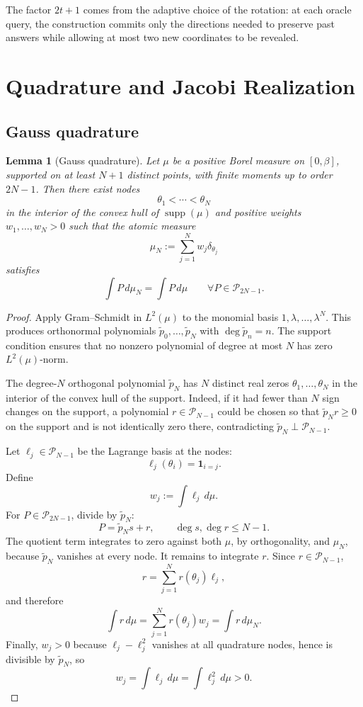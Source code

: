 \documentclass[11pt]{article}
\newtheorem{lemma}[theorem]{Lemma}
\theoremstyle{definition}
\newcommand{\Pcal}{\mathcal{P}}
\begin{document}
The factor \(2t+1\) comes from the adaptive choice of the rotation: at each
oracle query, the construction commits only the directions needed to preserve
past answers while allowing at most two new coordinates to be revealed.

\section{Quadrature and Jacobi Realization}

\subsection{Gauss quadrature}

\begin{lemma}[Gauss quadrature]
\label{lem:gauss}
Let \(\mu\) be a positive Borel measure on \([0,\beta]\), supported on at
least \(N+1\) distinct points, with finite moments up to order \(2N-1\).
Then there exist nodes
\[
  \theta_1<\cdots<\theta_N
\]
in the interior of the convex hull of \(\operatorname{supp}(\mu)\) and
positive weights \(w_1,\ldots,w_N>0\) such that the atomic measure
\[
  \mu_N:=\sum_{j=1}^N w_j\delta_{\theta_j}
\]
satisfies
\[
  \int P\,d\mu_N=\int P\,d\mu
  \qquad
  \forall P\in\Pcal_{2N-1}.
  \tag{3}
\]
\end{lemma}

\begin{proof}
Apply Gram--Schmidt in \(L^2(\mu)\) to the monomial basis
\(1,\lambda,\ldots,\lambda^N\).  This produces orthonormal polynomials
\(\tilde p_0,\ldots,\tilde p_N\) with \(\deg \tilde p_n=n\).  The support
condition ensures that no nonzero polynomial of degree at most \(N\) has zero
\(L^2(\mu)\)-norm.

The degree-\(N\) orthogonal polynomial \(\tilde p_N\) has \(N\) distinct real
zeros \(\theta_1,\ldots,\theta_N\) in the interior of the convex hull of the
support.  Indeed, if it had fewer than \(N\) sign changes on the support, a
polynomial \(r\in\Pcal_{N-1}\) could be chosen so that \(\tilde p_N r\ge 0\)
on the support and is not identically zero there, contradicting
\(\tilde p_N\perp \Pcal_{N-1}\).

Let \(\ell_j\in\Pcal_{N-1}\) be the Lagrange basis at the nodes:
\[
  \ell_j(\theta_i)=\mathbf 1_{i=j}.
\]
Define
\[
  w_j:=\int \ell_j\,d\mu.
\]
For \(P\in\Pcal_{2N-1}\), divide by \(\tilde p_N\):
\[
  P=\tilde p_N s+r,
  \qquad \deg s,\deg r\le N-1.
\]
The quotient term integrates to zero against both \(\mu\), by orthogonality,
and \(\mu_N\), because \(\tilde p_N\) vanishes at every node.  It remains to
integrate \(r\).  Since \(r\in\Pcal_{N-1}\),
\[
  r=\sum_{j=1}^N r(\theta_j)\ell_j,
\]
and therefore
\[
  \int r\,d\mu
  =
  \sum_{j=1}^N r(\theta_j)w_j
  =
  \int r\,d\mu_N.
\]
Finally, \(w_j>0\) because \(\ell_j-\ell_j^2\) vanishes at all quadrature
nodes, hence is divisible by \(\tilde p_N\), so
\[
  w_j=\int \ell_j\,d\mu=\int \ell_j^2\,d\mu>0.
\]
\end{proof}
\end{document}
